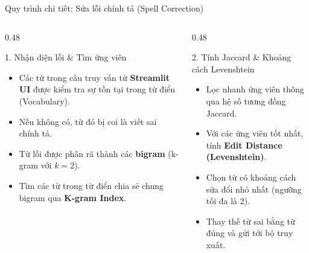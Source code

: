 \documentclass[aspectratio=169,11pt]{beamer}
\newcommand{\hl}[1]{\textcolor{accentorange}{\textbf{#1}}}
\begin{document}
\begin{frame}{Quy trình chi tiết: Sửa lỗi chính tả (Spell Correction)}
\begin{columns}
\begin{column}{0.48\textwidth}
    \begin{block}{1. Nhận diện lỗi & Tìm ứng viên}
        \begin{itemize}
            \item Các từ trong câu truy vấn từ \hl{Streamlit UI} được kiểm tra sự tồn tại trong từ điển (Vocabulary).
            \item Nếu không có, từ đó bị coi là viết sai chính tả.
            \item Từ lỗi được phân rã thành các \hl{bigram} (k-gram với $k=2$).
            \item Tìm các từ trong từ điển chia sẻ chung bigram qua \hl{K-gram Index}.
        \end{itemize}
    \end{block}
\end{column}
\begin{column}{0.48\textwidth}
    \begin{block}{2. Tính Jaccard & Khoảng cách Levenshtein}
        \begin{itemize}
            \item Lọc nhanh ứng viên thông qua hệ số tương đồng Jaccard.
            \item Với các ứng viên tốt nhất, tính \hl{Edit Distance (Levenshtein)}.
            \item Chọn từ có khoảng cách sửa đổi nhỏ nhất (ngưỡng tối đa là 2).
            \item Thay thế từ sai bằng từ đúng và gửi tới bộ truy xuất.
        \end{itemize}
    \end{block}
\end{column}
\end{columns}
\end{frame}
\end{document}
